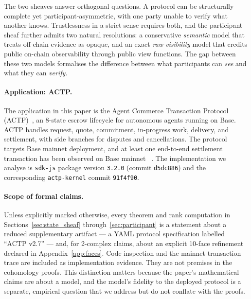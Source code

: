 \documentclass[11pt]{article}
\theoremstyle{plain}
\theoremstyle{definition}
\begin{document}
The two sheaves answer orthogonal questions.  A protocol can be structurally
complete yet participant-asymmetric, with one party unable to verify what
another knows.  Trustlessness in a strict sense requires both, and the
participant sheaf further admits two natural resolutions: a conservative
\emph{semantic} model that treats off-chain evidence as opaque, and an exact
\emph{raw-visibility} model that credits public on-chain observability
through public view functions.  The gap between these two models formalises
the difference between what participants can \emph{see} and what they can
\emph{verify}.

\paragraph{Application: ACTP.}
The application in this paper is the Agent Commerce Transaction Protocol
(ACTP)~\cite{AGIRAILSsdk}, an 8-state escrow lifecycle for autonomous agents
running on Base.  ACTP handles request, quote, commitment, in-progress work,
delivery, and settlement, with side branches for disputes and cancellations.
The protocol targets Base mainnet deployment, and at least one end-to-end
settlement transaction has been observed on Base mainnet
~\cite{ACTPmainnettx}.  The implementation we analyse
is \texttt{sdk-js} package version \texttt{3.2.0} (commit \texttt{d5dc886})
and the corresponding \texttt{actp-kernel} commit \texttt{91f4f90}.

\paragraph{Scope of formal claims.}
Unless explicitly marked otherwise, every theorem and rank computation in
Sections~\ref{sec:state_sheaf} through~\ref{sec:participant} is a statement
about a reduced supplementary artifact --- a YAML protocol specification
labelled ``ACTP v2.7'' --- and, for 2-complex claims, about an explicit
10-face refinement declared in Appendix~\ref{app:faces}.  Code inspection and
the mainnet transaction trace are included as implementation evidence.  They
are not premises in the cohomology proofs.  This distinction matters because
the paper's mathematical claims are about a model, and the model's fidelity
to the deployed protocol is a separate, empirical question that we address
but do not conflate with the proofs.
\end{document}
